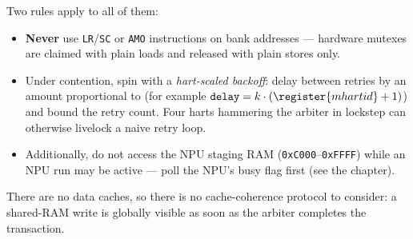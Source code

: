 Two rules apply to all of them:

\begin{itemize}
	\item \textbf{Never} use \texttt{LR}/\texttt{SC} or \texttt{AMO} instructions on  bank addresses --- hardware mutexes are claimed with plain loads and released with plain stores only.
	\item Under contention, spin with a \textit{hart-scaled backoff}: delay between retries by an amount proportional to  (for example $\mathtt{delay} = k \cdot (\register{mhartid} + 1)$) and bound the retry count. Four harts hammering the arbiter in lockstep can otherwise livelock a naive retry loop.
	\item Additionally, do not access the NPU staging RAM (\texttt{0xC000}--\texttt{0xFFFF}) while an NPU run may be active --- poll the NPU's busy flag first (see the  chapter).
\end{itemize}

There are no data caches, so there is no cache-coherence protocol to consider: a shared-RAM write is globally visible as soon as the arbiter completes the transaction.
